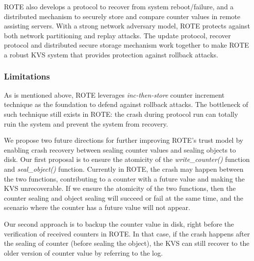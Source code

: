 ROTE also develops a protocol to recover from system reboot/failure, and a distributed 
mechanism to securely store and compare counter values in remote assisting servers.
With a strong network adversary model, ROTE protects
against both network partitioning and replay attacks. The update protocol, 
recover protocol and distributed secure storage mechanism work together to make ROTE 
a robust KVS system that provides protection against rollback attacks.

\subsubsection{Limitations}

As is mentioned above, ROTE leverages \textit{inc-then-store} counter increment 
technique as the foundation to defend against rollback attacks. The bottleneck 
of such technique still exists in ROTE: the crash during protocol run can totally 
ruin the system and prevent the system from recovery. 

We propose two future directions for further improving ROTE's trust model by enabling 
crash recovery between sealing counter values and sealing objects to disk.
Our first proposal is to ensure the atomicity of the \textit{write\_counter()} function
and \textit{seal\_object()} function. Currently in ROTE, the crash may happen between the 
two functions, contributing to a counter with a future value and making the KVS unrecoverable.
If we ensure the atomicity of the two functions, then the counter sealing and object sealing 
will succeed or fail at the same time, and the scenario where the counter has a future value 
will not appear.

Our second approach is to backup the counter value in disk, right before the verification 
of received counters in ROTE. In that case, if the crash happens after the sealing of counter
(before sealing the object), the KVS can still recover to the older version of counter value 
by referring to the log.
